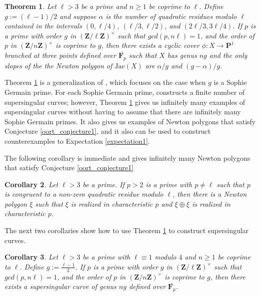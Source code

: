\documentclass{article}
\newtheorem{theorem}{Theorem}[section]
\newtheorem{corollary}[theorem]{Corollary}
\theoremstyle{remark}
\theoremstyle{definition}
\begin{document}
\begin{theorem}
\label{slopes}
Let $\ell > 3$ be a prime and $n \geq 1$ be coprime to $\ell$. Define $g := (\ell-1)/2$ and suppose $\alpha$ is the number of quadratic residues modulo $\ell$ contained in the intervals $(0,\ell/4)$, $(\ell/3,\ell/2)$, and $(2\ell/3, 3\ell/4)$. If $p$ is a prime with order $g$ in $\left (\mathbf{Z}/\ell\mathbf{Z} \right)^\times$ such that $gcd(p,n\ell) = 1$, and the order of $p$ in $\left (\mathbf{Z}/n\mathbf{Z} \right)^\times$ is coprime to $g$, then there exists a cyclic cover $\phi: X \to \mathbf{P}^1$ branched at three points defined over $\overline{\mathbf{F}_p}$ such that $X$ has genus $ng$ and the only slopes of the the Newton polygon of $\textrm{Jac}(X)$ are $\alpha/g$ and $(g-\alpha)/g$.
\end{theorem}

\par Theorem \ref{slopes} is a generalization of \cite[Corollary 3.10]{pries_cyclic}, which focuses on the case when $g$ is a Sophie Germain prime. For each Sophie Germain prime, \cite[Corollary 3.10]{pries_cyclic} constructs a finite number of supersingular curves; however, Theorem \ref{slopes} gives us infinitely many examples of supersingular curves without having to assume that there are infinitely many Sophie Germain primes. It also gives us examples of Newton polygons that satisfy Conjecture \ref{oort_conjecture1}, and it also can be used to construct counterexamples to Expectation \ref{expectation1}.

\par The following corollary is immediate and gives infinitely many Newton polygons that satisfy Conjecture \ref{oort_conjecture1}

\begin{corollary}\label{conjecture-corollary}
Let $\ell > 3$ be a prime. If $p > 2$ is a prime with $p \ne \ell$ such that $p$ is congruent to a non-zero quadratic residue modulo $\ell$, then there is a Newton polygon $\xi$ such that $\xi$ is realized in characteristic $p$ and $\xi \oplus \xi$ is realized in characteristic $p$.
\end{corollary}

The next two corollaries show how to use Theorem \ref{slopes} to construct supersingular curves.

\begin{corollary}\label{germain1}
    Let $\ell>3$ be a prime with $\ell \equiv 1$ modulo $4$ and $n \geq 1$ be coprime to $\ell$. Define $g := \frac{\ell-1}{2}$. If $p$ is a prime with order $g$ in $\left (\mathbf{Z}/\ell\mathbf{Z} \right)^\times$ such that $gcd(p,n\ell) = 1$, and the order of $p$ in $(\mathbf{Z}/n\mathbf{Z})^\times$ is coprime to $g$, then there exists a supersingular curve of genus $ng$ defined over $\overline{\mathbf{F}_p}$.
\end{corollary}
\end{document}
